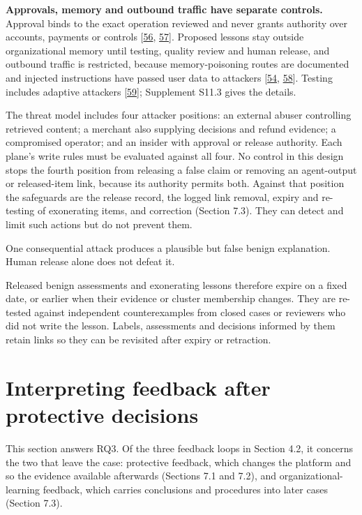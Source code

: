 \documentclass[acmlarge,nonacm]{acmart}
\begin{document}
\textbf{Approvals, memory and outbound traffic have separate controls.}
Approval binds to the exact operation reviewed and never grants
authority over accounts, payments or controls
{[}\protect\hyperlink{ref-Kumar2026}{56},
\protect\hyperlink{ref-InvariantLabs2025}{57}{]}. Proposed lessons stay
outside organizational memory until testing, quality review and human
release, and outbound traffic is restricted, because memory-poisoning
routes are documented and injected instructions have passed user data to
attackers {[}\protect\hyperlink{ref-Greshake2023}{54},
\protect\hyperlink{ref-Dash2026}{58}{]}. Testing includes adaptive
attackers {[}\protect\hyperlink{ref-Nasr2025}{59}{]}; Supplement S11.3
gives the details.

The threat model includes four attacker positions: an external abuser
controlling retrieved content; a merchant also supplying decisions and
refund evidence; a compromised operator; and an insider with approval or
release authority. Each plane's write rules must be evaluated against
all four. No control in this design stops the fourth position from
releasing a false claim or removing an agent-output or released-item
link, because its authority permits both. Against that position the
safeguards are the release record, the logged link removal, expiry and
re-testing of exonerating items, and correction (Section 7.3). They can
detect and limit such actions but do not prevent them.

One consequential attack produces a plausible but false benign
explanation. Human release alone does not defeat it.

Released benign assessments and exonerating lessons therefore expire on
a fixed date, or earlier when their evidence or cluster membership
changes. They are re-tested against independent counterexamples from
closed cases or reviewers who did not write the lesson. Labels,
assessments and decisions informed by them retain links so they can be
revisited after expiry or retraction.

\hypertarget{interpreting-feedback-after-protective-decisions}{%
\section{Interpreting feedback after protective
decisions}\label{interpreting-feedback-after-protective-decisions}}

This section answers RQ3. Of the three feedback loops in Section 4.2, it
concerns the two that leave the case: protective feedback, which changes
the platform and so the evidence available afterwards (Sections 7.1 and
7.2), and organizational-learning feedback, which carries conclusions
and procedures into later cases (Section 7.3).
\end{document}
